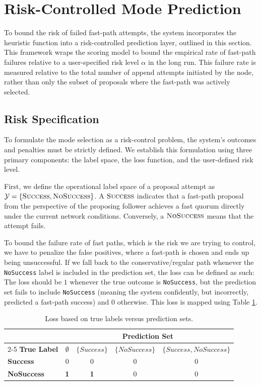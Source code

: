 \section{Risk-Controlled Mode Prediction}
\label{sec:risk-controlled_mode_prediction}
To bound the risk of failed fast-path attempts, the system incorporates the heuristic function into a risk-controlled prediction layer, outlined in this section. This framework wraps the scoring model to bound the empirical rate of fast-path failures relative to a user-specified risk level $\alpha$ in the long run. This failure rate is measured relative to the total number of append attempts initiated by the node, rather than only the subset of proposals where the fast-path was actively selected.

\subsection{Risk Specification}
To formulate the mode selection as a risk-control problem, the system's outcomes and penalties must be strictly defined. We establish this formulation using three primary components: the label space, the loss function, and the user-defined risk level.

First, we define the operational label space of a proposal attempt as $\mathcal{Y} = \{\textsc{Success}, \textsc{NoSuccess}\}$. A $\textsc{Success}$ indicates that a fast-path proposal from the perspective of the proposing follower achieves a fast quorum directly under the current network conditions. Conversely, a $\textsc{NoSuccess}$ means that the attempt fails.

To bound the failure rate of fast paths, which is the risk we are trying to control, we have to penalize the false positives, where a fast-path is chosen and ends up being unsuccessful. If we fall back to the conservative/regular path whenever the \texttt{NoSuccess} label is included in the prediction set, the loss can be defined as such: The loss should be $1$ whenever the true outcome is \texttt{NoSuccess}, but the prediction set fails to include \texttt{NoSuccess} (meaning the system confidently, but incorrectly, predicted a fast-path success) and $0$ otherwise. This loss is mapped using Table \ref{tab:loss-matrix}.

\begin{table}[t]
\centering
\renewcommand{\arraystretch}{1.3}
\begin{tabular}{lcccc}
& \multicolumn{4}{c}{\textbf{Prediction Set}} \\
\cmidrule(l){2-5}
\textbf{True Label} & $\emptyset$ & $\{Success\}$ & $\{NoSuccess\}$ & $\{Success, NoSuccess\}$ \\
\midrule
\textbf{Success}   & 0 & 0 & 0 & 0 \\
\textbf{NoSuccess} & \textbf{1} & \textbf{1} & 0 & 0 \\
\bottomrule
\end{tabular}
\caption{Loss based on true labels versus prediction sets.}
\label{tab:loss-matrix}
\end{table}

